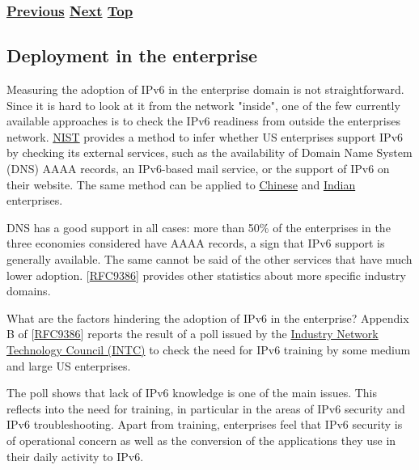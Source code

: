 \documentclass[
]{article}
\begin{document}
\subsubsection{\texorpdfstring{\hyperref[deployment-by-carriers]{Previous}
\hyperref[deployment-in-the-enterprise]{Next}
\hyperref[deployment-status]{Top}}{Previous Next Top}}\label{previous-next-top-36}

\pagebreak

\subsection{Deployment in the
enterprise}\label{deployment-in-the-enterprise}

Measuring the adoption of IPv6 in the enterprise domain is not
straightforward. Since it is hard to look at it from the network
"inside", one of the few currently available approaches is to check the
IPv6 readiness from outside the enterprise\textquotesingle s network.
\href{https://fedv6-deployment.antd.nist.gov/cgi-bin/generate-com}{NIST}
provides a method to infer whether US enterprises support IPv6 by
checking its external services, such as the availability of Domain Name
System (DNS) AAAA records, an IPv6-based mail service, or the support of
IPv6 on their website. The same method can be applied to
\href{http://218.2.231.237:5001/cgi-bin/generate}{Chinese} and
\href{https://cnlabs.in/IPv6_Mon/generate_industry.html}{Indian}
enterprises.

DNS has a good support in all cases: more than 50\% of the enterprises
in the three economies considered have AAAA records, a sign that IPv6
support is generally available. The same cannot be said of the other
services that have much lower adoption.
{[}\href{https://www.rfc-editor.org/info/rfc9386}{RFC9386}{]} provides
other statistics about more specific industry domains.

What are the factors hindering the adoption of IPv6 in the enterprise?
Appendix B of
{[}\href{https://www.rfc-editor.org/info/rfc9386}{RFC9386}{]} reports
the result of a poll issued by the
\href{https://industrynetcouncil.org/}{Industry Network Technology
Council (INTC)} to check the need for IPv6 training by some medium and
large US enterprises.

The poll shows that lack of IPv6 knowledge is one of the main issues.
This reflects into the need for training, in particular in the areas of
IPv6 security and IPv6 troubleshooting. Apart from training, enterprises
feel that IPv6 security is of operational concern as well as the
conversion of the applications they use in their daily activity to IPv6.
\end{document}
